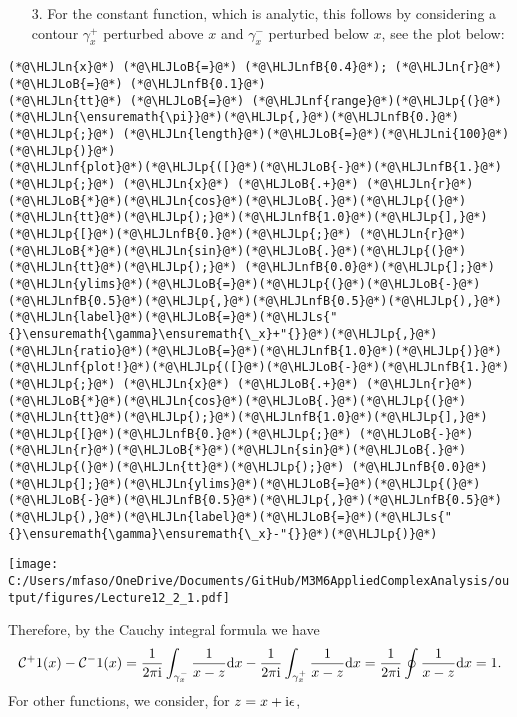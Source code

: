 \documentclass[12pt,landscape]{article}
\newcommand{\HLJLn}[1]{#1}
\newcommand{\HLJLnf}[1]{\textcolor[RGB]{66,102,213}{#1}}
\newcommand{\HLJLs}[1]{\textcolor[RGB]{201,61,57}{#1}}
\newcommand{\HLJLnfB}[1]{\textcolor[RGB]{59,151,46}{#1}}
\newcommand{\HLJLni}[1]{\textcolor[RGB]{59,151,46}{#1}}
\newcommand{\HLJLoB}[1]{\textcolor[RGB]{102,102,102}{\textbf{#1}}}
\newcommand{\HLJLp}[1]{#1}
\def\D{ {\rm d} }
\def\I{ {\rm i} }
\def\CC{ {\cal C} }
\def\dx{\D x}
\def\cent#1{\begin{center}#1\end{center} }
\begin{document}
{\begin{itemize}
\item[3. ] For the constant function, which is analytic, this follows by considering a contour $\gamma_x^+$ perturbed above $x$ and $\gamma_x^-$ perturbed below $x$, see the plot below:
\end{itemize}
\begin{lstlisting}
(*@\HLJLn{x}@*) (*@\HLJLoB{=}@*) (*@\HLJLnfB{0.4}@*); (*@\HLJLn{r}@*) (*@\HLJLoB{=}@*) (*@\HLJLnfB{0.1}@*)
(*@\HLJLn{tt}@*) (*@\HLJLoB{=}@*) (*@\HLJLnf{range}@*)(*@\HLJLp{(}@*)(*@\HLJLn{\ensuremath{\pi}}@*)(*@\HLJLp{,}@*)(*@\HLJLnfB{0.}@*)(*@\HLJLp{;}@*) (*@\HLJLn{length}@*)(*@\HLJLoB{=}@*)(*@\HLJLni{100}@*)(*@\HLJLp{)}@*)
(*@\HLJLnf{plot}@*)(*@\HLJLp{([}@*)(*@\HLJLoB{-}@*)(*@\HLJLnfB{1.}@*)(*@\HLJLp{;}@*) (*@\HLJLn{x}@*) (*@\HLJLoB{.+}@*) (*@\HLJLn{r}@*)(*@\HLJLoB{*}@*)(*@\HLJLn{cos}@*)(*@\HLJLoB{.}@*)(*@\HLJLp{(}@*)(*@\HLJLn{tt}@*)(*@\HLJLp{);}@*)(*@\HLJLnfB{1.0}@*)(*@\HLJLp{],}@*) (*@\HLJLp{[}@*)(*@\HLJLnfB{0.}@*)(*@\HLJLp{;}@*) (*@\HLJLn{r}@*)(*@\HLJLoB{*}@*)(*@\HLJLn{sin}@*)(*@\HLJLoB{.}@*)(*@\HLJLp{(}@*)(*@\HLJLn{tt}@*)(*@\HLJLp{);}@*) (*@\HLJLnfB{0.0}@*)(*@\HLJLp{];}@*)(*@\HLJLn{ylims}@*)(*@\HLJLoB{=}@*)(*@\HLJLp{(}@*)(*@\HLJLoB{-}@*)(*@\HLJLnfB{0.5}@*)(*@\HLJLp{,}@*)(*@\HLJLnfB{0.5}@*)(*@\HLJLp{),}@*)(*@\HLJLn{label}@*)(*@\HLJLoB{=}@*)(*@\HLJLs{"{}\ensuremath{\gamma}\ensuremath{\_x}+"{}}@*)(*@\HLJLp{,}@*) (*@\HLJLn{ratio}@*)(*@\HLJLoB{=}@*)(*@\HLJLnfB{1.0}@*)(*@\HLJLp{)}@*)
(*@\HLJLnf{plot!}@*)(*@\HLJLp{([}@*)(*@\HLJLoB{-}@*)(*@\HLJLnfB{1.}@*)(*@\HLJLp{;}@*) (*@\HLJLn{x}@*) (*@\HLJLoB{.+}@*) (*@\HLJLn{r}@*)(*@\HLJLoB{*}@*)(*@\HLJLn{cos}@*)(*@\HLJLoB{.}@*)(*@\HLJLp{(}@*)(*@\HLJLn{tt}@*)(*@\HLJLp{);}@*)(*@\HLJLnfB{1.0}@*)(*@\HLJLp{],}@*) (*@\HLJLp{[}@*)(*@\HLJLnfB{0.}@*)(*@\HLJLp{;}@*) (*@\HLJLoB{-}@*)(*@\HLJLn{r}@*)(*@\HLJLoB{*}@*)(*@\HLJLn{sin}@*)(*@\HLJLoB{.}@*)(*@\HLJLp{(}@*)(*@\HLJLn{tt}@*)(*@\HLJLp{);}@*) (*@\HLJLnfB{0.0}@*)(*@\HLJLp{];}@*)(*@\HLJLn{ylims}@*)(*@\HLJLoB{=}@*)(*@\HLJLp{(}@*)(*@\HLJLoB{-}@*)(*@\HLJLnfB{0.5}@*)(*@\HLJLp{,}@*)(*@\HLJLnfB{0.5}@*)(*@\HLJLp{),}@*)(*@\HLJLn{label}@*)(*@\HLJLoB{=}@*)(*@\HLJLs{"{}\ensuremath{\gamma}\ensuremath{\_x}-"{}}@*)(*@\HLJLp{)}@*)
\end{lstlisting}
\cent{\texttt{[image: C:/Users/mfaso/OneDrive/Documents/GitHub/M3M6AppliedComplexAnalysis/output/figures/Lecture12\_2\_1.pdf]}}
Therefore, by the Cauchy integral formula we have
\[
\CC^+ 1 (x) - \CC^- 1 (x) = {1 \over 2 \pi \I}\int_{\gamma_x^-} {1 \over x - z} \dx - {1 \over 2 \pi \I}\int_{\gamma_x^+} {1 \over x - z} \dx = {1 \over 2 \pi \I} \oint {1 \over x -z } \dx = 1.
\]
For other functions, we consider, for $z = x + \I \epsilon$,

}
\end{document}

